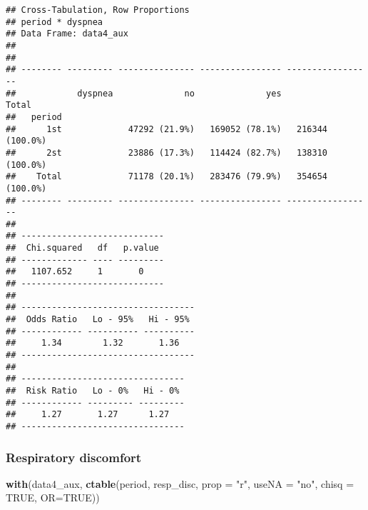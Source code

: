 \documentclass[
]{article}
\newenvironment{Shaded}{\begin{snugshade}}{\end{snugshade}}
\newcommand{\DataTypeTok}[1]{\textcolor[rgb]{0.13,0.29,0.53}{#1}}
\newcommand{\KeywordTok}[1]{\textcolor[rgb]{0.13,0.29,0.53}{\textbf{#1}}}
\newcommand{\NormalTok}[1]{#1}
\newcommand{\OtherTok}[1]{\textcolor[rgb]{0.56,0.35,0.01}{#1}}
\newcommand{\StringTok}[1]{\textcolor[rgb]{0.31,0.60,0.02}{#1}}
\begin{document}
\begin{verbatim}
## Cross-Tabulation, Row Proportions  
## period * dyspnea  
## Data Frame: data4_aux  
## 
## 
## -------- --------- --------------- ---------------- -----------------
##            dyspnea              no              yes             Total
##   period                                                             
##      1st             47292 (21.9%)   169052 (78.1%)   216344 (100.0%)
##      2st             23886 (17.3%)   114424 (82.7%)   138310 (100.0%)
##    Total             71178 (20.1%)   283476 (79.9%)   354654 (100.0%)
## -------- --------- --------------- ---------------- -----------------
## 
## ----------------------------
##  Chi.squared   df   p.value 
## ------------- ---- ---------
##   1107.652     1       0    
## ----------------------------
## 
## ----------------------------------
##  Odds Ratio   Lo - 95%   Hi - 95% 
## ------------ ---------- ----------
##     1.34        1.32       1.36   
## ----------------------------------
## 
## --------------------------------
##  Risk Ratio   Lo - 0%   Hi - 0% 
## ------------ --------- ---------
##     1.27       1.27      1.27   
## --------------------------------
\end{verbatim}

\hypertarget{respiratory-discomfort}{%
\subsubsection{Respiratory discomfort}\label{respiratory-discomfort}}

\begin{Shaded}
\begin{Highlighting}[]
\KeywordTok{with}\NormalTok{(data4_aux, }\KeywordTok{ctable}\NormalTok{(period, resp_disc, }\DataTypeTok{prop =} \StringTok{"r"}\NormalTok{, }\DataTypeTok{useNA =} \StringTok{"no"}\NormalTok{, }\DataTypeTok{chisq =} \OtherTok{TRUE}\NormalTok{, }\DataTypeTok{OR=}\OtherTok{TRUE}\NormalTok{))}
\end{Highlighting}
\end{Shaded}
\end{document}
